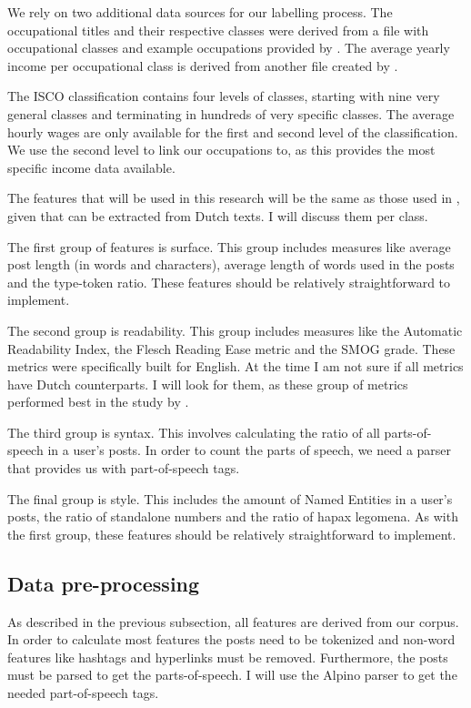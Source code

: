 \documentclass[11pt, a4paper]{article}
\begin{document}
We rely on two additional data sources for our labelling process. The occupational titles and their respective classes were derived from a file with occupational classes and example occupations provided by \citet{codelijsten}. The average yearly income per occupational class is derived from another file created by \citet{uurlonen}.

The ISCO classification contains four levels of classes, starting with nine very general classes and terminating in hundreds of very specific classes. The average hourly wages are only available for the first and second level of the classification. We use the second level to link our occupations to, as this provides the most specific income data available.

The features that will be used in this research will be the same as those used in \citet{flekova}, given that can be extracted from Dutch texts. I will discuss them per class.

The first group of features is surface. This group includes measures like average post length (in words and characters), average length of words used in the posts and the type-token ratio. These features should be relatively straightforward to implement. 

The second group is readability. This group includes measures like the Automatic Readability Index, the Flesch Reading Ease metric and the SMOG grade. These metrics were specifically built for English. At the time I am not sure if all metrics have Dutch counterparts. I will look for them, as these group of metrics performed best in the study by \citet{flekova}.

The third group is syntax. This involves calculating the ratio of all parts-of-speech in a user's posts. In order to count the parts of speech, we need a parser that provides us with part-of-speech tags.

The final group is style. This includes the amount of Named Entities in a user's posts, the ratio of standalone numbers and the ratio of hapax legomena. As with the first group, these features should be relatively straightforward to implement. 

\subsection{Data pre-processing}
As described in the previous subsection, all features are derived from our corpus. In order to calculate most features the posts need to be tokenized and non-word features like hashtags and hyperlinks must be removed. Furthermore, the posts must be parsed to get the parts-of-speech. I will use the Alpino parser to get the needed part-of-speech tags.
\end{document}
